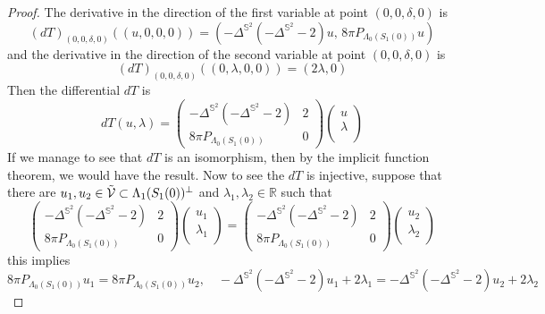 \documentclass[12pt,a4paper]{amsart}
\theoremstyle{plain}
\theoremstyle{definition}
\begin{document}
\begin{proof}
The derivative in the direction of the first variable at point $(0,0,\delta, 0) $ is 
$$(dT)_{(0,0,\delta, 0)} ( (u,0, 0,0)) = (  -\Delta^{\mathbb{S}^2} (- \Delta^{\mathbb{S}^2} -2)u   ,\,  8 \pi P_{\Lambda_0(S_1(0))} u  ) $$
and the derivative in the direction of the second variable at point $(0,0,\delta, 0) $ is 
$$(dT)_{(0,0,\delta, 0)} ( (0,\lambda, 0,0)) = (2 \lambda, 0 ) $$
Then the differential $dT$ is 
\begin{equation}
dT(u,\lambda) = 
    \begin{pmatrix}
 -\Delta^{\mathbb{S}^2} (- \Delta^{\mathbb{S}^2} -2)  & 2  \\
 8 \pi P_{\Lambda_0(S_1(0))}  & 0 
\end{pmatrix}
\begin{pmatrix}
u \\
\lambda \\
\end{pmatrix}
\end{equation}
If we manage to see that $dT$ is an isomorphism, then by the implicit function theorem, we would have the result.  Now to see the $dT$ is injective, suppose that there are $u_1,u_2 \in  \Tilde{\mathcal{V}} \subset \Lambda_1(S_1(0))^\bot $ and $ \lambda_1, \lambda_2 \in \mathbb{R} $ such that 
\begin{equation}
    \begin{pmatrix}
 -\Delta^{\mathbb{S}^2} (- \Delta^{\mathbb{S}^2} -2)  & 2  \\
 8 \pi P_{\Lambda_0(S_1(0))}  & 0 
\end{pmatrix}
\begin{pmatrix}
u_1 \\
\lambda_1 \\
\end{pmatrix}
=
\begin{pmatrix}
 -\Delta^{\mathbb{S}^2} (- \Delta^{\mathbb{S}^2} -2)  & 2  \\
 8 \pi P_{\Lambda_0(S_1(0))}  & 0 
\end{pmatrix}
\begin{pmatrix}
u_2 \\
\lambda_2 \\
\end{pmatrix}
\end{equation}
this implies 
$$  8 \pi P_{\Lambda_0(S_1(0))}u_1=  8 \pi P_{\Lambda_0(S_1(0))}u_2, \quad    -\Delta^{\mathbb{S}^2} (- \Delta^{\mathbb{S}^2} -2) u_1 +2\lambda_1=  -\Delta^{\mathbb{S}^2} (- \Delta^{\mathbb{S}^2} -2) u_2 +2\lambda_2  $$


\end{proof}
\end{document}
